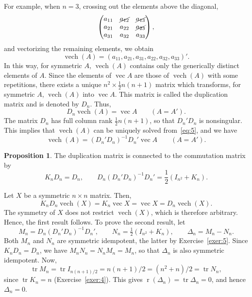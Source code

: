\documentclass[12pt,a4paper]{article}
\makeatletter
\theoremstyle{definition}
\newtheorem{proposition}{Proposition}
\renewenvironment{proof}[1][\proofname]{\par
  \pushQED{\qed}%
  \normalfont \topsep6\p@\@plus6\p@\relax
  \trivlist
  \item[\hskip\labelsep\bfseries #1\@addpunct{.}]\ignorespaces
}{%
  \popQED\endtrivlist\@endpefalse
}
\DeclareMathOperator{\tr}{tr}
\DeclareMathOperator{\vech}{vech}
\DeclareMathOperator{\avec}{vec}
\DeclareMathOperator{\rank}{r}
\makeatother
\begin{document}
For example, when $n = 3$, crossing out the elements above the diagonal,
\[
\begin{pmatrix}
a_{11} & \cancel{a_{12}} & \cancel{a_{13}} \\
a_{21} & a_{22} & \cancel{a_{23}} \\
a_{31} & a_{32} & a_{33}
\end{pmatrix},
\]
and vectorizing the remaining elements, we obtain
\[
\vech(A) = (a_{11}, a_{21}, a_{31}, a_{22}, a_{32}, a_{33})'.
\]
In this way, for symmetric $A$, $\vech(A)$ contains only the generically distinct elements of $A$. Since the elements of $\avec A$ are those of $\vech(A)$ with some repetitions, there exists a unique $n^2 \times \frac{1}{2}n(n+1)$ matrix which transforms, for symmetric $A$, $\vech(A)$ into $\avec A$. This matrix is called the duplication matrix and is denoted by $D_n$. %
Thus,
\begin{equation}\label{eq:5}
D_n \vech(A) = \avec A \qquad (A = A').
\end{equation}
The matrix $D_n$ has full column rank $\frac{1}{2}n(n+1)$, so that $D_n'D_n$ is nonsingular. This implies that $\vech(A)$ can be uniquely solved from~\eqref{eq:5}, and we have
\begin{equation}\label{eq:6}
\vech(A) = (D_n'D_n)^{-1} D_n' \avec A \qquad (A = A').
\end{equation}

\begin{proposition}\label{prp:9}
The duplication matrix is connected to the commutation matrix by
\[
K_n D_n = D_n, \qquad
D_n (D_n'D_n)^{-1} D_n' = \frac{1}{2}(I_{n^2} + K_n).
\]
\end{proposition}

\begin{proof}
Let $X$ be a symmetric $n \times n$ matrix. Then,
\[
K_n D_n \vech(X) = K_n \avec X = \avec X = D_n \vech(X).
\]
The symmetry of $X$ does not restrict $\vech(X)$, which is therefore arbitrary. Hence, the first result follows. %
To prove the second result, let
\[
M_n = D_n(D_n'D_n)^{-1}D_n', \qquad N_n = \tfrac{1}{2}(I_{n^2} + K_n), \qquad \Delta_n = M_n - N_n.
\]
Both $M_n$ and $N_n$ are symmetric idempotent, the latter by Exercise~\ref{exer:5}. Since $K_n D_n = D_n$, we have $M_n N_n = N_n M_n = M_n$, so that $\Delta_n$ is also symmetric idempotent. %
Now,
\[
\tr M_n = \tr I_{n(n+1)/2} = n(n+1)/2 = (n^2 + n)/2 = \tr N_n,
\]
since $\tr K_n = n$ (Exercise~\ref{exer:4}). This gives $\rank(\Delta_n) = \tr \Delta_n = 0$, and hence $\Delta_n = 0$. %
\end{proof}
\end{document}
